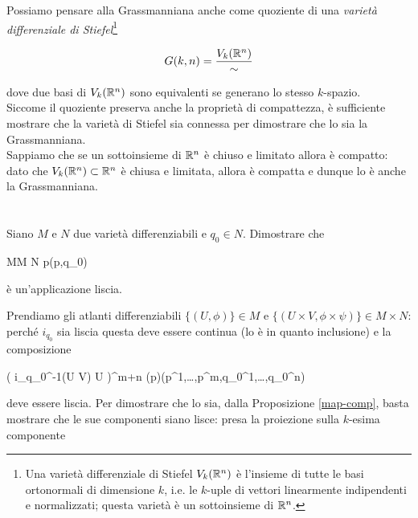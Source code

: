 Possiamo pensare alla Grassmanniana anche come quoziente di una \textit{varietà differenziale di Stiefel}\footnote{%
	Una varietà differenziale di Stiefel $ V_{k}(\mathbb{R}^{n}) $ è l'insieme di tutte le basi ortonormali di dimensione $ k $, i.e. le $ k $-uple di vettori linearmente indipendenti e normalizzati; questa varietà è un sottoinsieme di $ \mathbb{R}^{n} $.%
}

\begin{equation}
	G(k,n) = \dfrac{V_{k}(\mathbb{R}^{n})}{\sim}
\end{equation}

dove due basi di $ V_{k}(\mathbb{R}^{n}) $ sono equivalenti se generano lo stesso $ k $-spazio.\\
Siccome il quoziente preserva anche la proprietà di compattezza, è sufficiente mostrare che la varietà di Stiefel sia connessa per dimostrare che lo sia la Grassmanniana.\\
Sappiamo che se un sottoinsieme di $ \mathbb{R}^{n} $ è chiuso e limitato allora è compatto: dato che $ V_{k}(\mathbb{R}^{n}) \subset \mathbb{R}^{n} $ è chiusa e limitata, allora è compatta e dunque lo è anche la Grassmanniana.

%

\newpage

%

\section{}\label{es2-6}

\begin{tcolorbox}
	Siano $ M $ e $ N $ due varietà differenziabili e $ q_{0} \in N $. Dimostrare che
	
		{M}{M \times N}%
		{p}{(p,q_{0})}
	
	è un'applicazione liscia.
\end{tcolorbox}

Prendiamo gli atlanti differenziabili $ \{(U,\phi)\} \in M $ e $ \{(U \times V,\phi \times \psi)\} \in M \times N $: perché $ i_{q_{0}} $ sia liscia questa deve essere continua (lo è in quanto inclusione) e la composizione

%
	{\phi( i_{q_{0}}^{-1}(U \times V) \cap U )}{\R^{m+n}}%
	{\phi(p)}{(p^{1},\dots,p^{m},q_{0}^{1},\dots,q_{0}^{n})}

deve essere liscia. Per dimostrare che lo sia, dalla Proposizione \ref{map-comp}, basta mostrare che le sue componenti siano lisce: presa la proiezione sulla $ k $-esima componente

